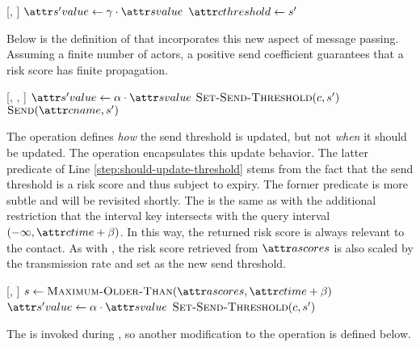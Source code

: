 \begin{function}{\nSetSendThreshold}[\vContact, \vScore]
  \State $\aNewScoreValue \assign \pSendCoefficient \cdot \aScoreValue$
  \State $\aContactThreshold \assign \vNewScore$
\end{function}

Below is the definition of \cApplyRiskScore{} that incorporates this new aspect of message passing. Assuming a finite number of actors, a positive send coefficient guarantees that a risk score has finite propagation.

\begin{function}{\nApplyRiskScore}[\vActor, \vContact, \vScore]
  \If{$\aContactThresholdValue < \aScoreValue \AND \aContactTime + \pTimeBuffer > \aScoreTime$}
    \State $\aNewScoreValue \assign \pTransmissionRate \cdot \aScoreValue$
    \State $\cSetSendThreshold[\vContact, \vNewScore]$
    \State $\cSend[\aContactName, \vNewScore]$
  \EndIf
\end{function}

The \cSetSendThreshold{} operation defines \emph{how} the send threshold is updated, but not \emph{when} it should be updated. The \cUpdateSendThreshold{} operation encapsulates this update behavior. The latter predicate of Line \ref{step:should-update-threshold} stems from the fact that the send threshold is a risk score and thus subject to expiry. The former predicate is more subtle and will be revisited shortly. The \cMaximumOlderThan{} is the same as \cMaximum{} with the additional restriction that the interval key intersects with the query interval $(-\infty, \aContactTime + \pTimeBuffer)$. In this way, the returned risk score is always relevant to the contact. As with \cApplyRiskScore{}, the risk score retrieved from $\aActorScores$ is also scaled by the transmission rate and set as the new send threshold.

\begin{function}{\nUpdateSendThreshold}[\vActor, \vContact]
   \label{step:should-update-threshold}
    \State $\vScore \assign \cMaximumOlderThan[\aActorScores, \aContactTime + \pTimeBuffer]$
    \State $\aNewScoreValue \assign \pTransmissionRate \cdot \aScoreValue$
    \State $\cSetSendThreshold[\vContact, \vNewScore]$
  \EndIf
\end{function}

The \cUpdateSendThreshold{} is invoked during \cApplyRiskScore{}, so another modification to the operation is defined below.

